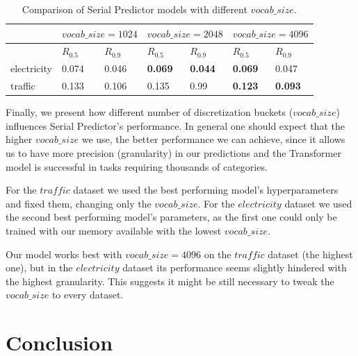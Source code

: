 \documentclass[en]{pracamgr}
\begin{document}
\begin{table}[h]
	\begin{center}
		\begin{tabular}
			{ |p{2cm}|p{1.5cm}|p{1.5cm}||p{1.5cm}|p{1.5cm}||p{1.5cm}|p{1.5cm}|   }
			\hline
			& \multicolumn{2}{c||}{$vocab\_size=1024$} & \multicolumn{2}{|c|}{$vocab\_size=2048$} & \multicolumn{2}{|c|}{$vocab\_size=4096$} \\
			\hline
			& \hfil $R_{0.5}$ & \hfil $R_{0.9}$ & \hfil $R_{0.5}$ & \hfil $R_{0.9} $ & \hfil $R_{0.5}$ & \hfil $R_{0.9} $
			\\
			\hline
			electricity & \hfil 0.074   & \hfil 0.046    & \hfil \textbf{0.069} &   \hfil \textbf{0.044} & \hfil \textbf{0.069} &   \hfil 0.047 \\
			
			traffic &  \hfil 0.133 &   \hfil 0.106 & 0.135 &   \hfil 0.99 & \textbf{\hfil 0.123} &   \hfil \textbf{0.093} \\
			\hline
		\end{tabular}
		\caption{\label{tab:results}Comparison of Serial Predictor models with different $vocab\_size$.}
	\end{center}
\end{table}

Finally, we present how different number of discretization buckets ($vocab\_size$) influences Serial Predictor's performance. In general one should expect that the higher $vocab\_size$ we use, the better performance we can achieve, since it allows us to have more precision (granularity) in our predictions and the Transformer model is successful in tasks requiring thousands of categories.

For the $traffic$ dataset we used the best performing model's hyperparameters and fixed them, changing only the $vocab\_size$. For the $electricity$ dataset we used the second best performing model's parameters, as the first one could only be trained with our memory available with the lowest $vocab\_size$. 


Our model works best with $vocab\_size = 4096$ on the $traffic$ dataset (the highest one), but in the $electricity$ dataset its performance seems slightly hindered with the highest granularity. This suggests it might be still necessary to tweak the $vocab\_size$ to every dataset.




\chapter{Conclusion}
\end{document}
